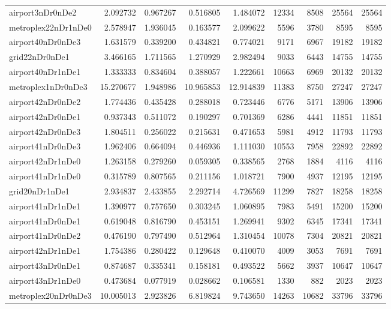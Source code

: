 \begin{longtable}{|l|r|r|r|r|r|r|r|r|}
airport3nDr0nDe2 & 2.092732 & 0.967267 & 0.516805 & 1.484072 & 12334 & 8508 & 25564 & 25564 \\
metroplex22nDr1nDe0 & 2.578947 & 1.936045 & 0.163577 & 2.099622 & 5596 & 3780 & 8595 & 8595 \\
airport40nDr0nDe3 & 1.631579 & 0.339200 & 0.434821 & 0.774021 & 9171 & 6967 & 19182 & 19182 \\
grid22nDr0nDe1 & 3.466165 & 1.711565 & 1.270929 & 2.982494 & 9033 & 6443 & 14755 & 14755 \\
airport40nDr1nDe1 & 1.333333 & 0.834604 & 0.388057 & 1.222661 & 10663 & 6969 & 20132 & 20132 \\
metroplex1nDr0nDe3 & 15.270677 & 1.948986 & 10.965853 & 12.914839 & 11383 & 8750 & 27247 & 27247 \\
airport42nDr0nDe2 & 1.774436 & 0.435428 & 0.288018 & 0.723446 & 6776 & 5171 & 13906 & 13906 \\
airport42nDr0nDe1 & 0.937343 & 0.511072 & 0.190297 & 0.701369 & 6286 & 4441 & 11851 & 11851 \\
airport42nDr0nDe3 & 1.804511 & 0.256022 & 0.215631 & 0.471653 & 5981 & 4912 & 11793 & 11793 \\
airport41nDr0nDe3 & 1.962406 & 0.664094 & 0.446936 & 1.111030 & 10553 & 7958 & 22892 & 22892 \\
airport42nDr1nDe0 & 1.263158 & 0.279260 & 0.059305 & 0.338565 & 2768 & 1884 & 4116 & 4116 \\
airport41nDr1nDe0 & 0.315789 & 0.807565 & 0.211156 & 1.018721 & 7900 & 4937 & 12195 & 12195 \\
grid20nDr1nDe1 & 2.934837 & 2.433855 & 2.292714 & 4.726569 & 11299 & 7827 & 18258 & 18258 \\
airport41nDr1nDe1 & 1.390977 & 0.757650 & 0.303245 & 1.060895 & 7983 & 5491 & 15200 & 15200 \\
airport41nDr0nDe1 & 0.619048 & 0.816790 & 0.453151 & 1.269941 & 9302 & 6345 & 17341 & 17341 \\
airport41nDr0nDe2 & 0.476190 & 0.797490 & 0.512964 & 1.310454 & 10078 & 7304 & 20821 & 20821 \\
airport42nDr1nDe1 & 1.754386 & 0.280422 & 0.129648 & 0.410070 & 4009 & 3053 & 7691 & 7691 \\
airport43nDr0nDe1 & 0.874687 & 0.335341 & 0.158181 & 0.493522 & 5662 & 3937 & 10647 & 10647 \\
airport43nDr1nDe0 & 0.473684 & 0.077919 & 0.028662 & 0.106581 & 1330 & 882 & 2023 & 2023 \\
metroplex20nDr0nDe3 & 10.005013 & 2.923826 & 6.819824 & 9.743650 & 14263 & 10682 & 33796 & 33796 \\

\end{longtable}
